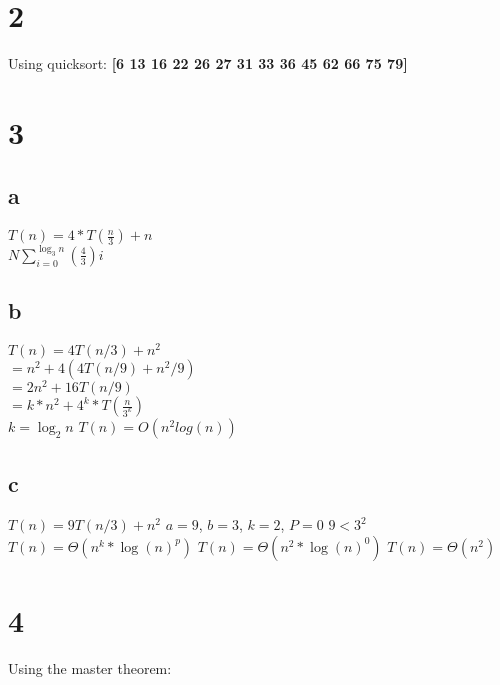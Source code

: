 \documentclass{article}
\begin{document}
\section{2}
Using quicksort:\newline
[22 36 6 79 26 45 75 13 31 62 27 66 33 16] \newline
[6 13 16 36 79 26 45 75 31 62 27 66 33 22] \newline
[6 13 16 22 79 26 45 75 31 62 27 66 33 36] \newline
[6 13 16 22 26 31 27 33 36 62 45 66 75 79] \newline
[6 13 16 22 26 27 31 33 36 62 45 66 75 79] \newline
\textbf{[6 13 16 22 26 27 31 33 36 45 62 66 75 79]} \newline
\section{3}
\subsection{a}
$T(n)=4*T(\frac{n}{3})+n$\\
\textbf{$N \sum_{i=0}^{\log_{3} n} (\frac{4}{3}) i$}
\subsection{b}
	$T(n)=4T(n/3)+n^2$\\
	$ =n^{2}+4(4T(n/9)+n^{2}/9)$\\
	$ =2n^{2}+16T(n/9)$\\
	$ =k*n^{2}+4^{k}*T(\frac{n}{3^{k}})$\\
$k=\log_{2} n$\newline
\textbf{$T(n)=O(n^{2}log (n))$}\newline
\subsection{c}
$T(n)=9T(n/3)+n^2$\newline
$a=9$, $b=3$, $k=2$, $P=0$\newline
$9<3^{2}$\newline
$T(n)=\Theta(n^{k} * \log (n)^{p})$\newline
$T(n)=\Theta(n^{2} * \log (n)^{0})$\newline
\textbf{$T(n)=\Theta(n^{2})$}
\newpage
\section{4}
Using the master theorem:\newline
\end{document}

